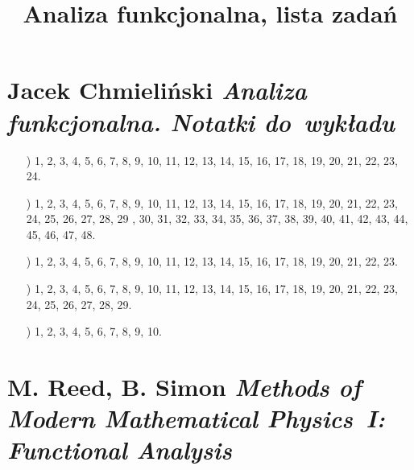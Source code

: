 \documentclass[a4paper,11pt]{article}
\title{Analiza funkcjonalna, lista zadań}
\numberwithin{equation}{section}
\begin{document}





\maketitle





\section{Jacek Chmieliński \textit{Analiza funkcjonalna.
    Notatki do~wykładu}}

\label{sec:Oznaczenia-i-konwencje}


\begin{itemize}

\item[\romannumeral1)] 1, 2, 3, 4, 5, 6, 7, 8, 9, 10, 11, 12, 13, 14, 15,
  16, 17, 18, 19, 20, 21, 22, 23, 24.

\item[\romannumeral2)] 1, 2, 3, 4, 5, 6, 7, 8, 9, 10, 11, 12, 13, 14, 15,
  16, 17, 18, 19, 20, 21, 22, 23, 24, 25, 26, 27, 28, 29 , 30, 31, 32, 33,
  34, 35, 36, 37, 38, 39, 40, 41, 42, 43, 44, 45, 46, 47, 48.

\item[\romannumeral3)] 1, 2, 3, 4, 5, 6, 7, 8, 9, 10, 11, 12, 13, 14, 15,
  16, 17, 18, 19, 20, 21, 22, 23.

\item[\romannumeral4)] 1, 2, 3, 4, 5, 6, 7, 8, 9, 10, 11, 12, 13, 14, 15,
  16, 17, 18, 19, 20, 21, 22, 23, 24, 25, 26, 27, 28, 29.

\item[\romannumeral5)] 1, 2, 3, 4, 5, 6, 7, 8, 9, 10.

\end{itemize}










\section{M. Reed, B. Simon \textit{Methods of Modern
    Mathematical Physics~I: Functional Analysis}}
\end{document}
